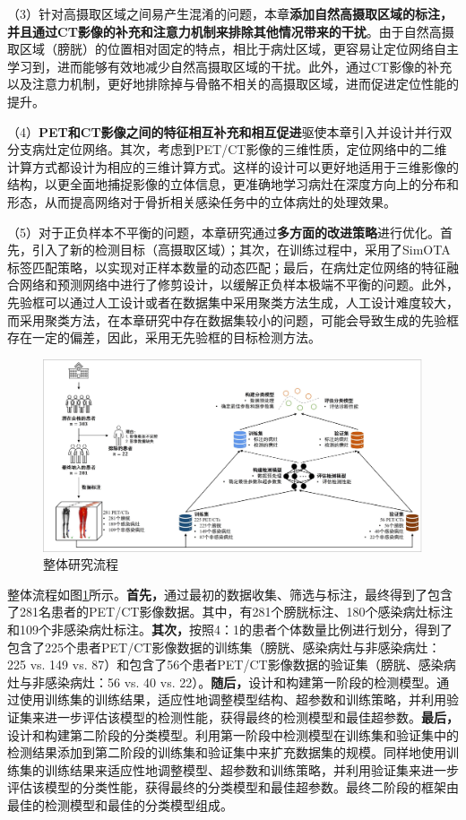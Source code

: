 （3）针对高摄取区域之间易产生混淆的问题，本章\textbf{添加自然高摄取区域的标注，并且通过CT影像的补充和注意力机制来排除其他情况带来的干扰}。由于自然高摄取区域（膀胱）的位置相对固定的特点，相比于病灶区域，更容易让定位网络自主学习到，进而能够有效地减少自然高摄取区域的干扰。此外，通过CT影像的补充以及注意力机制，更好地排除掉与骨骼不相关的高摄取区域，进而促进定位性能的提升。

（4）\textbf{PET和CT影像之间的特征相互补充和相互促进}驱使本章引入并设计并行双分支病灶定位网络。其次，考虑到PET/CT影像的三维性质，定位网络中的二维计算方式都设计为相应的三维计算方式。这样的设计可以更好地适用于三维影像的结构，以更全面地捕捉影像的立体信息，更准确地学习病灶在深度方向上的分布和形态，从而提高网络对于骨折相关感染任务中的立体病灶的处理效果。

（5）对于正负样本不平衡的问题，本章研究通过\textbf{多方面的改进策略}进行优化。首先，引入了新的检测目标（高摄取区域）；其次，在训练过程中，采用了SimOTA标签匹配策略，以实现对正样本数量的动态匹配；最后，在病灶定位网络的特征融合网络和预测网络中进行了修剪设计，以缓解正负样本极端不平衡的问题。此外，先验框可以通过人工设计或者在数据集中采用聚类方法生成，人工设计难度较大，而采用聚类方法，在本章研究中存在数据集较小的问题，可能会导致生成的先验框存在一定的偏差，因此，采用无先验框的目标检测方法。

\begin{figure}[htbp]
  \centering
  \includegraphics[width=\textwidth]{figures/chap04_study.jpg}
  \caption{整体研究流程}
  \label{fig:chap04_study}
\end{figure}

整体流程如图\ref{fig:chap04_study}所示。\textbf{首先，}通过最初的数据收集、筛选与标注，最终得到了包含了281名患者的PET/CT影像数据。其中，有281个膀胱标注、180个感染病灶标注和109个非感染病灶标注。\textbf{其次，}按照4：1的患者个体数量比例进行划分，得到了包含了225个患者PET/CT影像数据的训练集（膀胱、感染病灶与非感染病灶：225 vs. 149 vs. 87）和包含了56个患者PET/CT影像数据的验证集（膀胱、感染病灶与非感染病灶：56 vs. 40 vs. 22）。\textbf{随后，}设计和构建第一阶段的检测模型。通过使用训练集的训练结果，适应性地调整模型结构、超参数和训练策略，并利用验证集来进一步评估该模型的检测性能，获得最终的检测模型和最佳超参数。\textbf{最后，}设计和构建第二阶段的分类模型。利用第一阶段中检测模型在训练集和验证集中的检测结果添加到第二阶段的训练集和验证集中来扩充数据集的规模。同样地使用训练集的训练结果来适应性地调整模型、超参数和训练策略，并利用验证集来进一步评估该模型的分类性能，获得最终的分类模型和最佳超参数。最终二阶段的框架由最佳的检测模型和最佳的分类模型组成。

